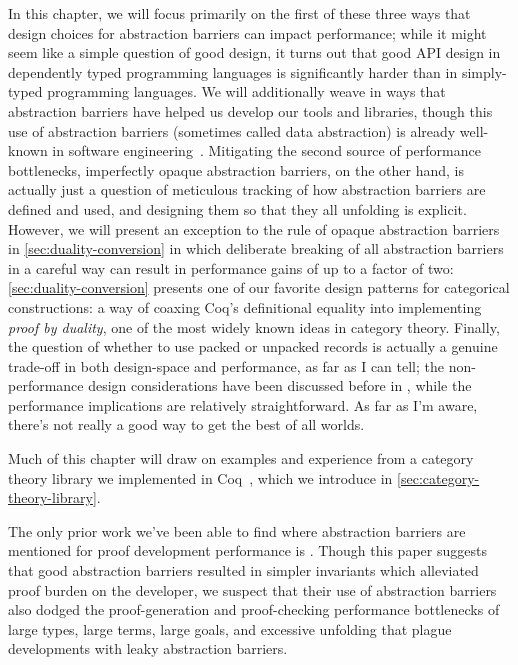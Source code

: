 In this chapter, we will focus primarily on the first of these three ways that design choices for abstraction barriers can impact performance; while it might seem like a simple question of good design, it turns out that good API design in dependently typed programming languages is significantly harder than in simply-typed programming languages.
We will additionally weave in ways that abstraction barriers have helped us develop our tools and libraries, though this use of abstraction barriers (sometimes called data abstraction) is already well-known in software engineering~\cite{Structure1996Sussman}.
Mitigating the second source of performance bottlenecks, imperfectly opaque abstraction barriers, on the other hand, is actually just a question of meticulous tracking of how abstraction barriers are defined and used, and designing them so that they all unfolding is explicit.
However, we will present an exception to the rule of opaque abstraction barriers in \autoref{sec:duality-conversion} in which deliberate breaking of all abstraction barriers in a careful way can result in performance gains of up to a factor of two:
\autoref{sec:duality-conversion} presents one of our favorite design patterns for categorical constructions: a way of coaxing Coq's definitional equality into implementing \emph{proof by duality}, one of the most widely known ideas in category theory.
Finally, the question of whether to use packed or unpacked records is actually a genuine trade-off in both design-space and performance, as far as I can tell;
the non-performance design considerations have been discussed before in \textcite{Packaging2009Garillot}, while the performance implications are relatively straightforward.
As far as I'm aware, there's not really a good way to get the best of all worlds.

Much of this chapter will draw on examples and experience from a category theory library we implemented in Coq~\cite{category-coq-experience}, which we introduce in \autoref{sec:category-theory-library}.

The only prior work we've been able to find where abstraction barriers are mentioned for proof development performance is \textcite{Deep2015Gu}.
Though this paper suggests that good abstraction barriers resulted in simpler invariants which alleviated proof burden on the developer, we suspect that their use of abstraction barriers also dodged the proof-generation and proof-checking performance bottlenecks of large types, large terms, large goals, and excessive unfolding that plague developments with leaky abstraction barriers.

